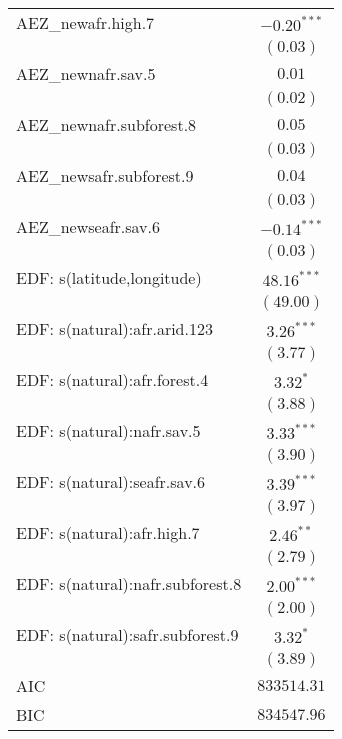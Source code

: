 \begin{longtable}{l c}
AEZ\_newafr.high.7               & $-0.20^{***}$  \\
                                 & $(0.03)$       \\
AEZ\_newnafr.sav.5               & $0.01$         \\
                                 & $(0.02)$       \\
AEZ\_newnafr.subforest.8         & $0.05$         \\
                                 & $(0.03)$       \\
AEZ\_newsafr.subforest.9         & $0.04$         \\
                                 & $(0.03)$       \\
AEZ\_newseafr.sav.6              & $-0.14^{***}$  \\
                                 & $(0.03)$       \\
EDF: s(latitude,longitude)       & $48.16^{***}$  \\
                                 & $(49.00)$      \\
EDF: s(natural):afr.arid.123     & $3.26^{***}$   \\
                                 & $(3.77)$       \\
EDF: s(natural):afr.forest.4     & $3.32^{*}$     \\
                                 & $(3.88)$       \\
EDF: s(natural):nafr.sav.5       & $3.33^{***}$   \\
                                 & $(3.90)$       \\
EDF: s(natural):seafr.sav.6      & $3.39^{***}$   \\
                                 & $(3.97)$       \\
EDF: s(natural):afr.high.7       & $2.46^{**}$    \\
                                 & $(2.79)$       \\
EDF: s(natural):nafr.subforest.8 & $2.00^{***}$   \\
                                 & $(2.00)$       \\
EDF: s(natural):safr.subforest.9 & $3.32^{*}$     \\
                                 & $(3.89)$       \\
\hline
AIC                              & $833514.31$    \\
BIC                              & $834547.96$    \\

\end{longtable}
